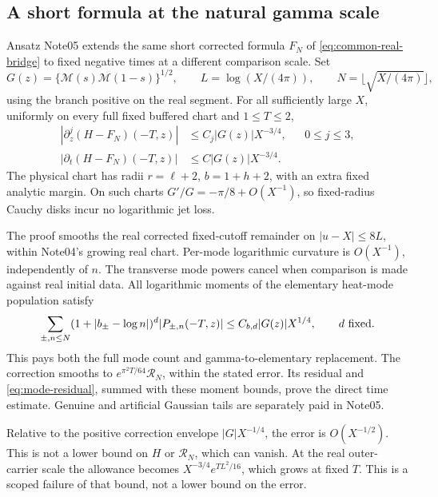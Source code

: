 \documentclass[11pt]{article}
\newcommand{\Mc}{\mathcal M}
\numberwithin{equation}{section}
\begin{document}
\subsection{A short formula at the natural gamma scale}
Ansatz Note05 \cite{ansatz05} extends the same short corrected formula
\(F_N\) of \eqref{eq:common-real-bridge} to fixed negative times at a
different comparison scale. Set
\[
 G(z)=\{\Mc(s)\Mc(1-s)\}^{1/2},\qquad
 L=\log(X/(4\pi)),\qquad N=\lfloor\sqrt{X/(4\pi)}\rfloor,
\]
using the branch positive on the real segment. For all sufficiently
large \(X\), uniformly on every full fixed buffered chart and
\(1\le T\le2\),
\begin{align}
 |\partial_z^j(H-F_N)(-T,z)|&\le C_j|G(z)|X^{-3/4},
                &&0\le j\le3,\label{eq:negative-natural}\\
 |\partial_t(H-F_N)(-T,z)|&\le C|G(z)|X^{-3/4}.
 \label{eq:negative-natural-time}
\end{align}
The physical chart has radii \(r=\ell+2\), \(b=1+h+2\), with an
extra fixed analytic margin. On such charts \(G'/G=-\pi/8+O(X^{-1})\),
so fixed-radius Cauchy disks incur no logarithmic jet loss.

The proof smooths the real corrected fixed-cutoff remainder on
\(|u-X|\le8L\), within Note04's growing real chart. Per-mode logarithmic
curvature is \(O(X^{-1})\), independently of \(n\). The transverse
mode powers cancel when comparison is made against real initial data.
All logarithmic moments of the elementary heat-mode population satisfy
\[
 \sum_{\pm,n\le N}(1+|b_\pm-\log n|)^d|P_{\pm,n}(-T,z)|
 \le C_{b,d}|G(z)|X^{1/4},\qquad d\ \hbox{fixed}.
\]
This pays both the full mode count and gamma-to-elementary replacement.
The correction smooths to \(e^{\pi^2T/64}\mathcal R_N\), within the
stated error. Its residual and \eqref{eq:mode-residual}, summed with
these moment bounds, prove the direct time estimate. Genuine and
artificial Gaussian tails are separately paid in Note05.

Relative to the positive correction envelope \(|G|X^{-1/4}\), the
error is \(O(X^{-1/2})\). This is not a lower bound on \(H\) or
\(\mathcal R_N\), which can vanish. At the real outer-carrier scale
the allowance becomes
\(X^{-3/4}e^{TL^2/16}\), which grows at fixed \(T\).
This is a scoped failure of that bound, not a lower bound on the error.
\end{document}
